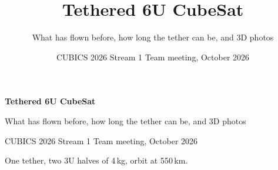 \documentclass[aspectratio=169,11pt]{beamer}
\title{Tethered 6U CubeSat}
\subtitle{What has flown before, how long the tether can be, and 3D photos}
\date{CUBICS 2026 \textperiodcentered{} Stream 1 \textperiodcentered{} Team meeting, October 2026}
\author{}
\begin{document}
\begin{frame}[plain]
  \vfill
  {\Huge\bfseries Tethered 6U CubeSat\par}
  \vspace{0.3cm}
  {\Large What has flown before, how long the tether can be, and 3D photos\par}
  \vspace{0.6cm}
  {\normalsize\color{black!65} CUBICS 2026 \textperiodcentered{} Stream 1 \textperiodcentered{} Team meeting, October 2026\par}
  \vspace{0.4cm}
  {\small\color{black!65} One tether, two 3U halves of 4\,kg, orbit at 550\,km.\par}
  \vfill
\end{frame}
\end{document}

